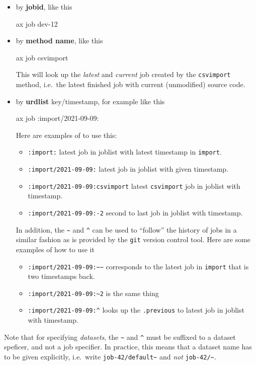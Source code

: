 \begin{itemize}
\item[] by \textbf{jobid}, like this
  \begin{shell}
    ax job dev-12
  \end{shell}
\item[] by \textbf{method name}, like this
  \begin{shell}
    ax job csvimport
  \end{shell}
  This will look up the \textsl{latest} and \textsl{current} job
  created by the \texttt{csvimport} method, i.e.\ the latest finished
  job with current (unmodified) source code.
\item[] by \textbf{urdlist} key/timestamp, for example like this
  \begin{shell}
    ax job :import/2021-09-09:
  \end{shell}
  Here are examples of to use this:
  \begin{itemize}
    \item[] \texttt{:import:} latest job in joblist with latest timestamp in \texttt{import}.
    \item[] \texttt{:import/2021-09-09:} latest job in joblist with given timestamp.
    \item[] \texttt{:import/2021-09-09:csvimport} latest \texttt{csvimport} job in joblist with timestamp.
    \item[] \texttt{:import/2021-09-09:-2} second to last job in joblist with timestamp.
  \end{itemize}

  In addition, the \texttt{\textasciitilde} and \texttt{\texttt{\^{}}}
  can be used to ``follow'' the history of jobs in a similar fashion
  as is provided by the \texttt{git} version control tool.  Here are
  some examples of how to use it
  \begin{itemize}
  \item[] \texttt{:import/2021-09-09:\textasciitilde\textasciitilde} corresponds to the
    latest job in \texttt{import} that is two timestamps back.
  \item[] \texttt{:import/2021-09-09:\textasciitilde 2} is the same thing
  \item[] \texttt{:import/2021-09-09:\^{}} looks up the
    \texttt{.previous} to latest job in joblist with timestamp.
  \end{itemize}
\end{itemize}

Note that for specifying \textsl{datasets}, the
\texttt{\textasciitilde} and \texttt{\^{}} must be suffixed to a
dataset speficer, and not a job specifier.  In practice, this means
that a dataset name has to be given explicitly, i.e.\ write
\texttt{job-42/default\textasciitilde} and \textsl{not} \texttt{job-42/\textasciitilde}.



